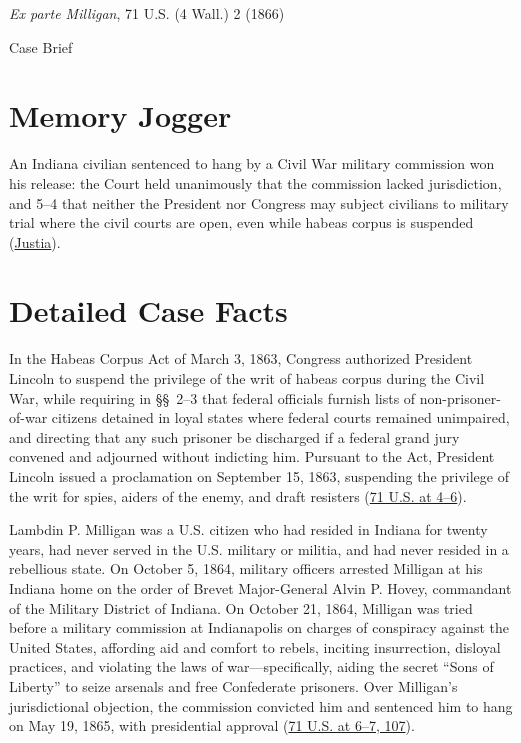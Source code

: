 \documentclass[12pt]{article}
\begin{document}
\begin{center}
{\LARGE \textit{Ex parte Milligan}, 71 U.S. (4 Wall.) 2 (1866)\par}
\vspace{0.8em}
{\large Case Brief\par}
\end{center}
\vspace{1em}

\section{Memory Jogger}
An Indiana civilian sentenced to hang by a Civil War military commission won his release: the Court held unanimously that the commission lacked jurisdiction, and 5--4 that neither the President nor Congress may subject civilians to military trial where the civil courts are open, even while habeas corpus is suspended (\href{https://supreme.justia.com/cases/federal/us/71/2/}{Justia}).

\section{Detailed Case Facts}
In the Habeas Corpus Act of March 3, 1863, Congress authorized President Lincoln to suspend the privilege of the writ of habeas corpus during the Civil War, while requiring in \S\S~2--3 that federal officials furnish lists of non-prisoner-of-war citizens detained in loyal states where federal courts remained unimpaired, and directing that any such prisoner be discharged if a federal grand jury convened and adjourned without indicting him. Pursuant to the Act, President Lincoln issued a proclamation on September 15, 1863, suspending the privilege of the writ for spies, aiders of the enemy, and draft resisters (\href{https://supreme.justia.com/cases/federal/us/71/2/}{71 U.S. at 4--6}).

Lambdin P. Milligan was a U.S. citizen who had resided in Indiana for twenty years, had never served in the U.S. military or militia, and had never resided in a rebellious state. On October 5, 1864, military officers arrested Milligan at his Indiana home on the order of Brevet Major-General Alvin P. Hovey, commandant of the Military District of Indiana. On October 21, 1864, Milligan was tried before a military commission at Indianapolis on charges of conspiracy against the United States, affording aid and comfort to rebels, inciting insurrection, disloyal practices, and violating the laws of war---specifically, aiding the secret ``Sons of Liberty'' to seize arsenals and free Confederate prisoners. Over Milligan's jurisdictional objection, the commission convicted him and sentenced him to hang on May 19, 1865, with presidential approval (\href{https://supreme.justia.com/cases/federal/us/71/2/}{71 U.S. at 6--7, 107}).
\end{document}
